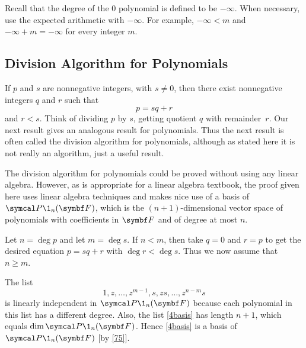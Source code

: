 
Recall that the degree of the $0$ polynomial is defined to  be $-\infty$. When necessary, use the expected arithmetic
with\/ $-\infty$.  For example,\/ $-\infty < m$ and\/ $-\infty + m = -\infty$ for every integer\/ $m$.

\subsection{Division Algorithm for Polynomials}

If $p$ and $s$ are nonnegative integers, with $s \ne 0$, then there exist
nonnegative integers $q$ and $r$ such that
\[
p = sq + r
\]
and $r < s$.  Think of dividing $p$ by $s$, getting quotient $q$ with
remainder~$r$. Our next result gives an analogous result for polynomials.
Thus the next result is often called the division algorithm for polynomials, although as stated here it is not really an algorithm, just a useful result.


The division algorithm for polynomials could be proved without using any linear algebra. However, as is appropriate for a linear algebra textbook, the proof given here uses linear algebra techniques and makes nice use of a basis of $\P\1_n(\F{})$, which is the $(n+1)$-dimensional vector space of polynomials with coefficients in $\F{}$ and of degree at most $n$.


\proof
Let $n = \deg p$ and let $m = \deg s$. If $n < m$, then take $q = 0$ and $r = p$ to get the desired equation $p = sq + r$ with
$\deg r < \deg s$. Thus we now assume that $n \ge m$.

The list
\begin{equation} \label{4basis}
1, z, \ldots, z^{m-1}, s, zs, \ldots, z^{n-m} s
\end{equation}%
is linearly independent in $\P\1_n(\F{})$ because each polynomial in this list has a different degree. Also, the list \ref{4basis} has length $n+1$, which equals $ \dim \P\1_n(\F{})$. Hence \ref{4basis} is a basis of $\P\1_n(\F{})$ [by \ref{75}].

